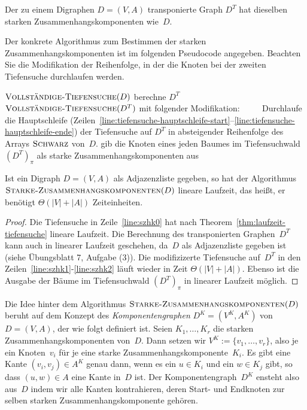 \begin{prop}
\label{beob:d-vs-dt}
Der zu einem Digraphen $D=(V,A)$ transponierte Graph $D^T$ hat dieselben starken Zusammenhangskomponenten wie~$D$.
\end{prop}

\begin{bem} 
Der konkrete Algorithmus zum Bestimmen der starken Zusammenhangskomponenten ist im folgenden Pseudocode angegeben.
Beachten Sie die Modifikation der Reihenfolge, in der die Knoten bei der zweiten Tiefensuche durchlaufen werden.

\begin{algorithm}[H]
\caption{$\cc{Starke-Zusammenhangskomponenten}(D)$}
 \begin{algorithmic}[1]
  \STATE\label{line:szhk0} $\mathop{\text{\textsc{Vollständige-Tiefensuche}}}(D)$
  \STATE berechne $D^T$
  \STATE\label{line:szhk1} $\mathop{\text{\textsc{Vollständige-Tiefensuche}}}(D^T)$ mit folgender Modifikation:
  \STATE\label{line:szhk2} $\qquad$ Durchlaufe die Hauptschleife (Zeilen~\ref{line:tiefensuche-hauptschleife-start}--\ref{line:tiefensuche-hauptschleife-ende}) der Tiefensuche auf $D^T$ in absteigender Reihenfolge des Arrays $\mathop{\text{\textsc{Schwarz}}}$ von~$D$.
  \STATE gib die Knoten eines jeden Baumes im Tiefensuchwald $(D^T)_\pi$ als starke Zusammenhangskomponenten aus
 \end{algorithmic}
\end{algorithm}
\end{bem} 

\begin{thm}
\label{thm:starke-zshgk-laufzeit}
Ist ein Digraph $D=(V,A)$ als Adjazenzliste gegeben, so hat der Algorithmus $\cc{Starke-Zusammenhangskomponenten}(D)$ lineare Laufzeit, das heißt, er benötigt $\Theta(|V|+|A|)$ Zeiteinheiten.
\end{thm}

\begin{proof}
Die Tiefensuche in Zeile~\ref{line:szhk0} hat nach Theorem~\ref{thm:laufzeit-tiefensuche} lineare Laufzeit.
Die Berechnung des transponierten Graphen~$D^T$ kann auch in linearer Laufzeit geschehen, da~$D$ als Adjazenzliste gegeben ist (siehe Übungsblatt 7, Aufgabe (3)).
Die modifizizerte Tiefensuche auf~$D^T$ in den Zeilen~\ref{line:szhk1}-\ref{line:szhk2} läuft wieder in Zeit $\Theta(|V|+|A|)$.
Ebenso ist die Ausgabe der Bäume im Tiefensuchwald $(D^T)_\pi$ in linearer Laufzeit möglich.
\end{proof}

\begin{bem}
Die Idee hinter dem Algorithmus $\cc{Starke-Zusammenhangskomponenten}(D)$ beruht auf dem Konzept des \emph{Komponentengraphen} $D^K=(V^K,A^K)$ von $D=(V,A)$, der wie folgt definiert ist.
Seien $K_1,\ldots,K_r$ die starken Zusammenhangskomponenten von~$D$.
Dann setzen wir $V^K:=\{v_1,\ldots,v_r\}$, also je ein Knoten~$v_i$ für je eine starke Zusammenhangskomponente~$K_i$.
Es gibt eine Kante $(v_i,v_j) \in A^K$ genau dann, wenn es ein $u \in K_i$ und ein $w \in K_j$ gibt, so dass $(u,w) \in A$ eine Kante in~$D$ ist.
Der Komponentengraph~$D^K$ ensteht also aus~$D$ indem wir alle Kanten kontrahieren, deren Start- und Endknoten zur selben starken Zusammenhangskomponente gehören.
\end{bem}

